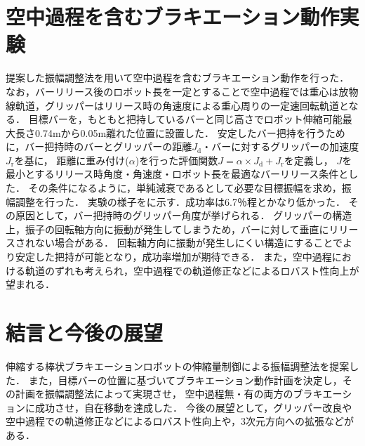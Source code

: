 \begin{small}
\section{空中過程を含むブラキエーション動作実験}
\vspace{-2mm}
提案した振幅調整法を用いて空中過程を含むブラキエーション動作を行った．
なお，バーリリース後のロボット長を一定とすることで空中過程では重心は放物線軌道，グリッパーはリリース時の角速度による重心周りの一定速回転軌道となる．
目標バーを，もともと把持しているバーと同じ高さでロボット伸縮可能最大長さ0.74mから0.05m離れた位置に設置した．
安定したバー把持を行うために，バー把持時のバーとグリッパーの距離$J_{\mathrm{d}}$・バーに対するグリッパーの加速度$J_{\mathrm{r}}$を基に，
距離に重み付け($\alpha$)を行った評価関数$J=\alpha \times J_{\mathrm{d}}+J_{\mathrm{r}}$を定義し，
$J$を最小とするリリース時角度・角速度・ロボット長を最適なバーリリース条件とした．
その条件になるように，単純減衰であるとして必要な目標振幅を求め，振幅調整を行った．
実験の様子をに示す．成功率は6.7％程とかなり低かった．
その原因として，バー把持時のグリッパー角度が挙げられる．
グリッパーの構造上，振子の回転軸方向に振動が発生してしまうため，バーに対して垂直にリリースされない場合がある．
回転軸方向に振動が発生しにくい構造にすることでより安定した把持が可能となり，成功率増加が期待できる．
また，空中過程における軌道のずれも考えられ，空中過程での軌道修正などによるロバスト性向上が望まれる．
\section{結言と今後の展望}
\vspace{-2mm}
伸縮する棒状ブラキエーションロボットの伸縮量制御による振幅調整法を提案した．
また，目標バーの位置に基づいてブラキエーション動作計画を決定し，その計画を振幅調整法によって実現させ，
空中過程無・有の両方のブラキエーションに成功させ，自在移動を達成した．
今後の展望として，グリッパー改良や空中過程での軌道修正などによるロバスト性向上や，3次元方向への拡張などがある．
\vspace{-2mm}






{


}

\end{small}

